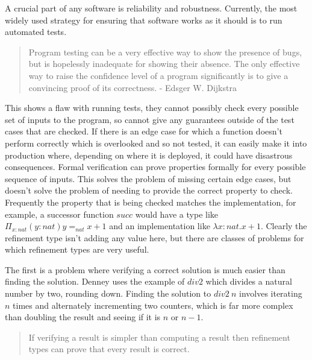 A crucial part of any software is reliability and robustness.
Currently, the most widely used strategy for ensuring that software works as it should
is to run automated tests.
\begin{quote}
    Program testing can be a very effective way to show the presence of bugs, but is
    hopelessly inadequate for showing their absence.
    The only effective way to raise the confidence level of a program significantly is
    to give a convincing proof of its correctness. - Edsger W. Dijkstra \cite{dijkstra72}
\end{quote}
This shows a flaw with running tests, they cannot possibly check every possible set of inputs
to the program, so cannot give any guarantees outside of the test cases that are checked.
If there is an edge case for which a function doesn't perform correctly which is overlooked
and so not tested, it can easily make it into production where, depending on where it is
deployed, it could have disastrous consequences.
Formal verification can prove properties formally for every possible sequence of inputs.
This solves the problem of missing certain edge cases, but doesn't solve the problem of
needing to provide the correct property to check.
Frequently the property that is being checked matches the implementation, for example,
a successor function $succ$ would have a type like $\Pi_{x:nat} (y:nat) y =_{nat} x+1$
and an implementation like $\lambda x:nat . x+1$.
Clearly the refinement type isn't adding any value here,
but there are classes of problems for which refinement types are very useful.

The first is a problem where verifying a correct solution is much easier than finding
the solution.
Denney uses the example of $div2$ which divides a natural number by two, rounding down.
Finding the solution to $div2\ n$ involves iterating $n$ times and alternately incrementing
two counters, which is far more complex than doubling the result and seeing if it is $n$ or
$n-1$.
\begin{quote}
    If verifying a result is simpler than computing a result then refinement types can prove that
    every result is correct.
\end{quote}

